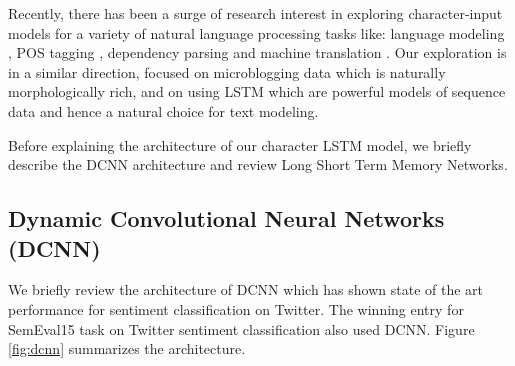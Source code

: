 \documentclass{article} %
\begin{document}
Recently, there has been a surge of research interest in exploring character-input models for a variety of natural language processing tasks like: language modeling \cite{kim2015character}, POS tagging \cite{ling2015finding}, dependency parsing \cite{ballesteros2015improved} and machine translation \cite{ling2015character}.
Our exploration is in a similar direction, focused on microblogging data which is naturally morphologically rich, and on using LSTM which are powerful models of sequence data and hence a natural choice for text modeling.

Before explaining the architecture of our character LSTM model, we briefly describe the DCNN architecture and review Long Short Term Memory Networks.

\subsection{Dynamic Convolutional Neural Networks (DCNN)}
We briefly review the architecture of DCNN \cite{kalchbrenner2014convolutional} which has shown state of the art performance for sentiment classification on Twitter. The winning entry for SemEval15 \cite{severynunitn} task on Twitter sentiment classification also used DCNN. Figure \ref{fig:dcnn} summarizes the architecture.
\end{document}
